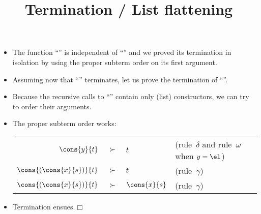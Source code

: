 \documentclass[wide]{slides}
\begin{document}
\begin{slide}
  \title{Termination / List flattening}

  \begin{itemize}

    \item The function ``'' is independent of ``''
      and we proved its termination in isolation by using the proper
      subterm order on its first argument.

    \item Assuming now that ``'' terminates, let us prove the
      termination of ``''.

    \item Because the recursive calls to ``'' contain only
      (list) constructors, we can try to order their arguments.

    \item The proper subterm order works:

      \begin{tabular}{r@{\;\,}c@{\;}ll}
        \(\cons{y}{t}\) & \(\succ\) & \(t\) & (rule~\(\delta\)
          and rule~\(\omega\) when \(y=\el\))\\
        \(\cons{(\cons{x}{s})}{t}\) & \(\succ\) & \(t\)
          & (rule~\(\gamma\))\\
        \(\cons{(\cons{x}{s})}{t}\) & \(\succ\) & \(\cons{x}{s}\)
          & (rule~\(\gamma\))
      \end{tabular}

    \item Termination ensues.\hfill\(\Box\)

  \end{itemize}

\end{slide}
\end{document}
